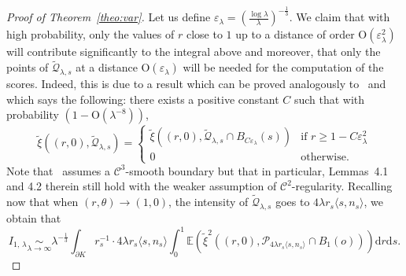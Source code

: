 \documentclass[10pt]{amsart}
\theoremstyle{definition}\newtheorem{defi}[theo]{Definition}\newtheorem{rema}[theo]{Remark}\newtheorem{exam}[theo]{Example}\newtheorem{exem}[theo]{Example}\newtheorem{nota}[theo]{Notation}
\newcommand{\cC}{\mathcal{C}}
\newcommand{\cP}{\mathcal{P}}
\newcommand{\cQ}{\mathcal{Q}}
\newcommand{\la}{\lambda}
\newcommand{\dd}{\mathrm{d}}
\newcommand{\Odd}{\mathrm{O}}
\newcommand{\E}{\mathbb{E}}
\newcommand{\noi}{\noindent}
\newcommand*{\MK}{\mkern 2mu}
\begin{document}
\begin{proof}[{Proof of Theorem~\ref{theo:var}}]
Let us define $\varepsilon_\la=(\tfrac{\log \lambda}{\lambda})^{-\frac13}$. We claim that with high probability, only the values of $r$ close to $1$ up to a distance of order $\Odd(\varepsilon_\lambda^2)$ will contribute significantly to the integral above and moreover, that only the points of $\widetilde{\cQ}_{\la,s}$ at a distance $\Odd(\varepsilon_\lambda)$ will be needed for the computation of the scores. Indeed, this is due to a result which can be proved analogously to~\cite[Lemma~4.1$\MK$(a), Lemma~4.2]{cy14} and which says the following: there exists a positive constant $C$ such that with probability $(1-\Odd(\lambda^{-8}))$,
\[
\widetilde{\xi}\left((r,0),\widetilde{\cQ}_{\la,s}\right)=
\begin{cases}
\widetilde{\xi}\left((r,0),\widetilde{\cQ}_{\la,s}\cap B_{C\varepsilon_\la}(s)\right)& \text{if }r\ge 1-C\varepsilon_\la^2\\
0 & \text{otherwise}.
\end{cases}
\]
Note that~\cite{cy14} assumes a $\cC^3$-smooth boundary but that in particular, Lemmas~4.1 and 4.2 therein still hold with the weaker assumption of $\cC^2$-regularity. Recalling now that when $(r,\theta)\to (1,0)$, the intensity of $\widetilde{\cQ}_{\la,s}$ goes to $4\lambda r_s\langle s,n_s\rangle$, we obtain that
\begin{equation}\label{eq:I1lambdaok}
I_{1,\,\lambda} \underset{\lambda\to\infty}{\sim}\lambda^{-\frac13}
\int_{\partial K}r_s^{-1}\cdot 4\lambda r_s\langle s,n_s\rangle
\int_{0}^1\E\left(\widetilde{\xi}^2\left((r,0),\cP_{4\lambda r_s\langle s,n_s\rangle}\cap B_1(o)\right)\right)\dd r \dd s.
\end{equation}


\end{proof}
\end{document}
